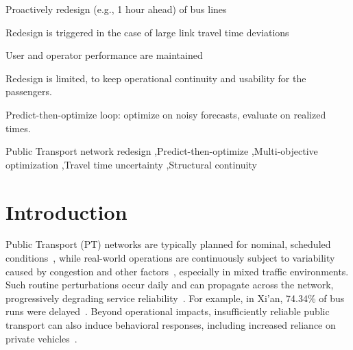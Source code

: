 \documentclass[a4paper,fleqn]{cas-sc}
\begin{document}
\begin{highlights}
\item Proactively redesign (e.g., 1 hour ahead) of bus lines
\item Redesign is triggered in the case of large link travel time deviations
\item User and operator performance are maintained
\item Redesign is limited, to keep operational continuity and usability for the passengers.
\item Predict-then-optimize loop: optimize on noisy forecasts, evaluate on realized times.
\end{highlights}


\begin{keywords}
Public Transport network redesign \sep Predict-then-optimize \sep Multi-objective optimization \sep Travel time uncertainty  \sep Structural continuity
\end{keywords}

\maketitle

\section{Introduction}

Public Transport (PT) networks are typically planned for nominal, scheduled conditions~\citep{ibarra2015planning}, while real-world operations are continuously subject to variability caused by congestion and other factors~\citep{buchel2020review, danaher2020minutes}, especially in mixed traffic environments. Such routine perturbations occur daily and can propagate across the network, progressively degrading service reliability~\citep{marra2020delay}. For example, in Xi’an, 74.34\% of bus runs were delayed~\citep{zhang2022travel}. 
Beyond operational impacts, insufficiently reliable public transport can also induce behavioral responses, including increased reliance on private vehicles~\citep{rodier2025evaluation}.
\end{document}
